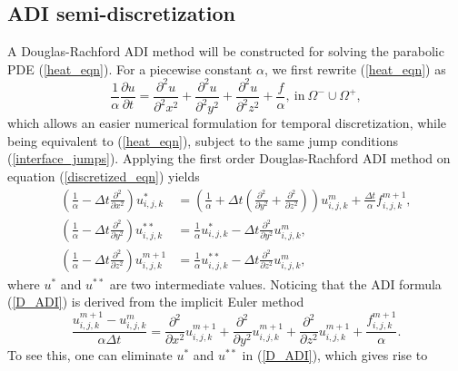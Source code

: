 \documentclass[dissertation]{uathesis}
\begin{document}
\begin{body}
\section{ADI semi-discretization}
A Douglas-Rachford ADI method \cite{douglas1955numerical2, paeceman1955numerical} will be constructed for solving the parabolic PDE (\ref{heat_eqn}).
For a piecewise constant $\alpha$, we first rewrite (\ref{heat_eqn}) as
%
\begin{equation} \label{discretized_eqn}
\frac{1}{\alpha} \frac{\partial u}{\partial t} = \frac{\partial^{2} u}{\partial^{2} x^{2}} + \frac{\partial^{2} u}{\partial^{2} y^{2}} + \frac{\partial^{2} u}{\partial^{2} z^{2}} + \frac{f}{\alpha},   ~ \mbox{in} ~ \Omega^{-}\cup\Omega^{+},
\end{equation}
%
which allows an easier numerical formulation for temporal discretization, while being
equivalent to (\ref{heat_eqn}), subject to the same jump conditions (\ref{interface_jumps}).
Applying the first order Douglas-Rachford ADI method on equation (\ref{discretized_eqn}) yields
%
\begin{align} \label{D_ADI}
(\frac{1}{\alpha}-\Delta t \frac{\partial^2}{\partial x^2}) u^{*}_{i,j,k}   &= (\frac{1}{\alpha} + \Delta t (\frac{\partial^2}{\partial y^2} + \frac{\partial^2}{\partial z^2})) u^{m}_{i,j,k} + \frac{\Delta t}{\alpha} f^{m+1}_{i,j,k}, \nonumber \\
(\frac{1}{\alpha}-\Delta t \frac{\partial^2}{\partial y^2}) u^{**}_{i,j,k}  &= \frac{1}{\alpha} u^{*}_{i,j,k} - \Delta t \frac{\partial^2}{\partial y^2} u^{m}_{i,j,k},  \\
(\frac{1}{\alpha}-\Delta t \frac{\partial^2}{\partial z^2}) u^{m+1}_{i,j,k} &= \frac{1}{\alpha} u^{**}_{i,j,k} - \Delta t \frac{\partial^2}{\partial z^2} u^{m}_{i,j,k}, \nonumber
\end{align}
%
where $u^{*}$ and $u^{**}$ are two intermediate values. Noticing that the ADI formula (\ref{D_ADI}) is derived from the implicit Euler method
%
\begin{equation} \label{implicit_Euler}
\frac{u^{m+1}_{i,j,k}-u^{m}_{i,j,k}}{\alpha \Delta t} = \frac{\partial^2}{\partial x^2} u^{m+1}_{i,j,k} + \frac{\partial^2}{\partial y^2} u^{m+1}_{i,j,k} + \frac{\partial^2}{\partial z^2} u^{m+1}_{i,j,k} + \frac{f^{m+1}_{i,j,k}}{\alpha}.
\end{equation}
%
To see this, one can eliminate $u^{*}$ and $u^{**}$ in (\ref{D_ADI}), which gives rise to
%
\begin{multline} \label{connection_1}

\end{multline}
\end{body}
\end{document}
